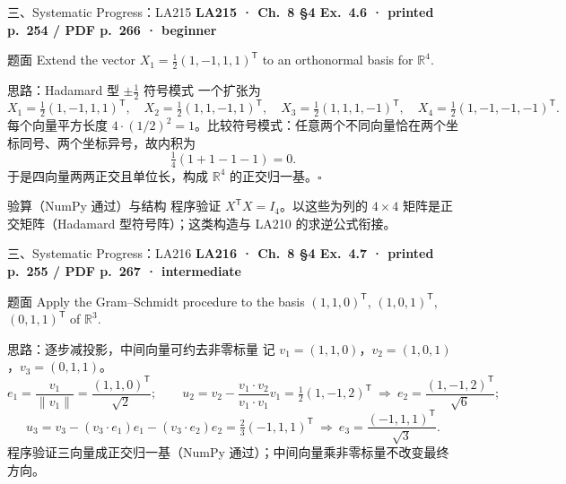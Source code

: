 \documentclass[aspectratio=169,10pt,fontset=none]{ctexbeamer}
\newcommand{\ex}[1]{\textcolor{accent}{\footnotesize\bfseries #1}}
\begin{document}
\begin{frame}[t]{三、Systematic Progress：LA215}
  \leavevmode\ex{LA215 · Ch.~8 §4 Ex.~4.6 · printed p.~254 / PDF p.~266 · beginner}
  \begin{block}{\footnotesize 题面}
    \scriptsize Extend the vector $X_1=\frac12(1,-1,1,1)^{\mathsf T}$ to an orthonormal basis for $\mathbb R^4$.
  \end{block}
  \begin{exampleblock}{\footnotesize 思路：Hadamard 型 $\pm\frac12$ 符号模式}
    \scriptsize
    一个扩张为
    $$X_1=\tfrac12(1,-1,1,1)^{\mathsf T},\quad X_2=\tfrac12(1,1,-1,1)^{\mathsf T},\quad X_3=\tfrac12(1,1,1,-1)^{\mathsf T},\quad X_4=\tfrac12(1,-1,-1,-1)^{\mathsf T}.$$
    每个向量平方长度 $4\cdot(1/2)^2=1$。比较符号模式：任意两个不同向量恰在两个坐标同号、两个坐标异号，故内积为
    $$\tfrac14(1+1-1-1)=0.$$
    于是四向量两两正交且单位长，构成 $\mathbb R^4$ 的正交归一基。$\square$
  \end{exampleblock}
  \begin{block}{\footnotesize 验算（NumPy 通过）与结构}
    \scriptsize 程序验证 $X^{\mathsf T}X=I_4$。以这些为列的 $4\times4$ 矩阵是正交矩阵（Hadamard 型符号阵）；这类构造与 LA210 的求逆公式衔接。
  \end{block}
\end{frame}

\begin{frame}[t]{三、Systematic Progress：LA216}
  \leavevmode\ex{LA216 · Ch.~8 §4 Ex.~4.7 · printed p.~255 / PDF p.~267 · intermediate}
  \begin{block}{\footnotesize 题面}
    \scriptsize Apply the Gram--Schmidt procedure to the basis $(1,1,0)^{\mathsf T}$, $(1,0,1)^{\mathsf T}$, $(0,1,1)^{\mathsf T}$ of $\mathbb R^3$.
  \end{block}
  \begin{exampleblock}{\footnotesize 思路：逐步减投影，中间向量可约去非零标量}
    \scriptsize
    记 $v_1=(1,1,0)$，$v_2=(1,0,1)$，$v_3=(0,1,1)$。
    $$e_1=\frac{v_1}{\lVert v_1\rVert}=\frac{(1,1,0)^{\mathsf T}}{\sqrt2};\qquad
      u_2=v_2-\frac{v_1\cdot v_2}{v_1\cdot v_1}v_1=\tfrac12(1,-1,2)^{\mathsf T}\ \Rightarrow\ e_2=\frac{(1,-1,2)^{\mathsf T}}{\sqrt6};$$
    $$u_3=v_3-(v_3\cdot e_1)e_1-(v_3\cdot e_2)e_2=\tfrac23(-1,1,1)^{\mathsf T}\ \Rightarrow\ e_3=\frac{(-1,1,1)^{\mathsf T}}{\sqrt3}.$$
    程序验证三向量成正交归一基（NumPy 通过）；中间向量乘非零标量不改变最终方向。
  \end{exampleblock}
\end{frame}
\end{document}
